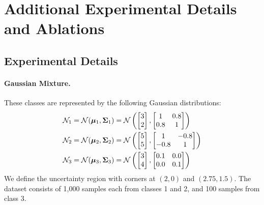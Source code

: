 \section{Additional Experimental Details and Ablations}
\label{app:add_exp}

\subsection{Experimental Details}
\label{app:add_exp_det}

\paragraph{Gaussian Mixture.} These classes are represented by the following Gaussian distributions:
\begin{align*}
\mathcal{N}_1 = \mathcal{N}(\boldsymbol{\mu}_1, \boldsymbol{\Sigma}_1) &= \mathcal{N}\left(
\begin{bmatrix}
3 \\
2
\end{bmatrix},
\begin{bmatrix}
1 & 0.8 \\
0.8 & 1
\end{bmatrix}
\right) \notag \\
\mathcal{N}_2 = \mathcal{N}(\boldsymbol{\mu}_2, \boldsymbol{\Sigma}_2) &= \mathcal{N}\left(
\begin{bmatrix}
5 \\
5
\end{bmatrix},
\begin{bmatrix}
1 & -0.8 \\
-0.8 & 1
\end{bmatrix}
\right) \notag \\
\mathcal{N}_3 = \mathcal{N}(\boldsymbol{\mu}_3, \boldsymbol{\Sigma}_3) &= \mathcal{N}\left(
\begin{bmatrix}
3 \\
4
\end{bmatrix},
\begin{bmatrix}
0.1 & 0.0 \\
0.0 & 0.1
\end{bmatrix}
\right)
\end{align*}
We define the uncertainty region with corners at $(2, 0)$ and $(2.75, 1.5)$. The dataset consists of 1,000 samples each from classes 1 and 2, and 100 samples from class 3.

